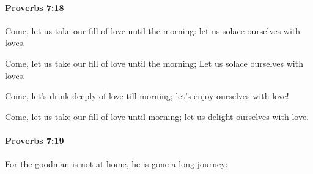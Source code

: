 		\paragraph{Proverbs 7:18} %
			\label{PROVERBS-7-18}

			Come, let us take our fill of love until the morning: let us solace ourselves with loves.

			\begin{versebox}
					\item[BHS] 
					\item[ASV] Come, let us take our fill of love until the morning; Let us solace ourselves with loves.
					\item[NIV] Come, let’s drink deeply of love till morning; let’s enjoy ourselves with love!
					\item[NRSV] Come, let us take our fill of love until morning; let us delight ourselves with love.
			\end{versebox}

		\paragraph{Proverbs 7:19} %
			\label{PROVERBS-7-19}

			For the goodman is not at home, he is gone a long journey:

